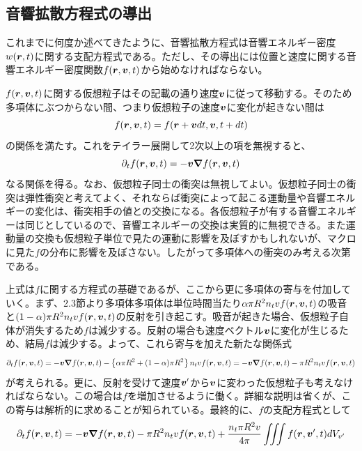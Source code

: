 \documentclass[dvipdfmx, 9pt, a4paper]{jsarticle}
\newcommand{\bm}[1]{{\mbox{\boldmath $#1$}}}
\begin{document}
\subsection{音響拡散方程式の導出}
これまでに何度か述べてきたように、音響拡散方程式は音響エネルギー密度$w(\bm r, t)$に関する支配方程式である。ただし、その導出には位置と速度に関する音響エネルギー密度関数$f(\bm r, \bm v, t)$から始めなければならない。\par
$f(\bm r, \bm v, t)$に関する仮想粒子はその記載の通り速度$\bm v$に従って移動する。そのため多項体にぶつからない間、つまり仮想粒子の速度$\bm v$に変化が起きない間は
\begin{equation}
f(\bm r, \bm v, t)=f(\bm r+\bm vdt, \bm v, t+dt) \notag
\end{equation}
の関係を満たす。これをテイラー展開して2次以上の項を無視すると、
\begin{equation}
\partial_tf(\bm r, \bm v, t)=-\bm v \bm \nabla f(\bm r, \bm v, t) \notag
\end{equation}
なる関係を得る。なお、仮想粒子同士の衝突は無視してよい。仮想粒子同士の衝突は弾性衝突と考えてよく、それならば衝突によって起こる運動量や音響エネルギーの変化は、衝突相手の値との交換になる。各仮想粒子が有する音響エネルギーは同じとしているので、音響エネルギーの交換は実質的に無視できる。また運動量の交換も仮想粒子単位で見たの運動に影響を及ぼすかもしれないが、マクロに見た$f$の分布に影響を及ぼさない。したがって多項体への衝突のみ考える次第である。\par
上式は$f$に関する方程式の基礎であるが、ここから更に多項体の寄与を付加していく。まず、2.3節より多項体多項体は単位時間当たり$\alpha \pi R^2n_tvf(\bm r, \bm v, t)$の吸音と$(1-\alpha) \pi R^2n_tvf(\bm r, \bm v, t)$の反射を引き起こす。吸音が起きた場合、仮想粒子自体が消失するため$f$は減少する。反射の場合も速度ベクトル$\bm v$に変化が生じるため、結局$f$は減少する。よって、これら寄与を加えた新たな関係式
\begin{equation}
\partial_tf(\bm r, \bm v, t)=-\bm v \bm \nabla f(\bm r, \bm v, t)-\left\{\alpha \pi R^2 + (1-\alpha)\pi R^2 \right\}n_tvf(\bm r, \bm v, t)=-\bm v \bm \nabla f(\bm r, \bm v, t)-\pi R^2n_tvf(\bm r, \bm v, t) \notag
\end{equation}
が考えられる。更に、反射を受けて速度$\bm v'$から$\bm v$に変わった仮想粒子も考えなければならない。この場合は$f$を増加させるように働く。詳細な説明は省くが、この寄与は解析的に求めることが知られている。最終的に、$f$の支配方程式として
\begin{equation}
\partial_tf(\bm r, \bm v, t)=-\bm v \bm \nabla f(\bm r, \bm v, t)-\pi R^2n_tvf(\bm r, \bm v, t) + \frac{n_t\pi R^2 v}{4\pi}\iiint f(\bm r, \bm v', t)dV_{v'}
\end{equation}
\end{document}
